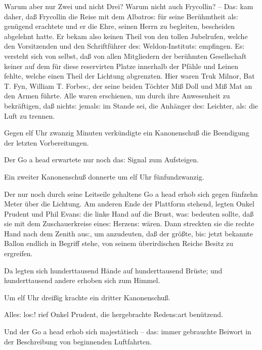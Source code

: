 \documentclass[oneside,12pt]{book}
\newenvironment{antiqua}{\normalfont}{}
\newcommand{\s}{s:}
\begin{document}
Warum aber nur Zwei und nicht Drei? Warum nicht auch Frycollin? --
Da{\s} kam daher, da{\ss} Frycollin die Reise mit dem
{\glqq}Albatro{\s}{\grqq} f\"ur seine Ber\"uhmtheit al{\s} gen\"ugend
erachtete und er die Ehre, seinen Herrn zu begleiten, bescheiden
abgelehnt hatte. Er bekam also keinen Theil von den tollen
Jubelrufen, welche den Vorsitzenden und den Schriftf\"uhrer de{\s}
Weldon-Institut{\s} empfingen. E{\s} versteht sich von selbst,
da{\ss} von allen Mitgliedern der ber\"uhmten Gesellschaft keiner auf
dem f\"ur diese reservirten Platze innerhalb der Pf\"ahle und Leinen
fehlte, welche einen Theil der Lichtung abgrenzten. Hier waren Truk
Milnor, Bat T. Fyn, William T. Forbe{\s}, der seine beiden T\"ochter
Mi{\ss} Doll und Mi{\ss} Mat an den Armen f\"uhrte. Alle waren
erschienen, um durch ihre Anwesenheit zu bekr\"aftigen, da{\ss}
nicht{\s} jemal{\s} im Stande sei, die Anh\"anger de{\s}
{\glqq}Leichter, al{\s} die Luft{\grqq} zu trennen.

Gegen elf Uhr zwanzig Minuten verk\"undigte ein Kanonenschu{\ss} die
Beendigung der letzten Vorbereitungen.

Der \begin{antiqua}Go a head\end{antiqua} erwartete nur noch da{\s}
Signal zum Aufsteigen.

Ein zweiter Kanonenschu{\ss} donnerte um elf Uhr f\"unfundzwanzig.

Der nur noch durch seine Leitseile gehaltene \begin{antiqua}Go a
head\end{antiqua} erhob sich gegen f\"unfzehn Meter \"uber die
Lichtung. Am anderen Ende der Plattform stehend, legten Onkel Prudent
und Phil Evan{\s} die linke Hand auf die Brust, wa{\s} bedeuten
sollte, da{\ss} sie mit dem Zuschauerkreise eine{\s} Herzen{\s}
w\"aren. Dann streckten sie die rechte Hand nach dem Zenith au{\s},
um anzudeuten, da{\ss} der gr\"o{\ss}te, bi{\s} jetzt bekannte Ballon
endlich in Begriff stehe, von seinem \"uberirdischen Reiche Besitz zu
ergreifen.

Da legten sich hunderttausend H\"ande auf hunderttausend Br\"uste;
und hunderttausend andere erhoben sich zum Himmel.

Um elf Uhr drei{\ss}ig krachte ein dritter Kanonenschu{\ss}.

{\glqq}Alle{\s} lo{\s}!{\grqq} rief Onkel Prudent, die hergebrachte
Reden{\s}art ben\"utzend.

Und der \begin{antiqua}Go a head\end{antiqua} erhob sich
{\glqq}majest\"atisch{\grqq} -- da{\s} immer gebrauchte Beiwort in
der Beschreibung von beginnenden Luftfahrten.
\end{document}

